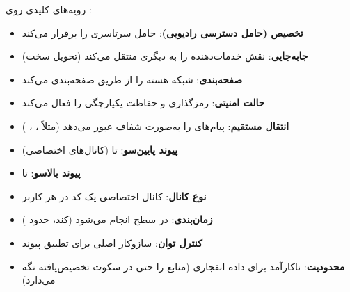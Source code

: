 
رویه‌های کلیدی روی :

\begin{itemize}
\tightlist
\item
  \textbf{تخصیص  (حامل دسترسی رادیویی)}: حامل سرتاسری را برقرار می‌کند
\item
  \textbf{جابه‌جایی}: نقش  خدمات‌دهنده را به  دیگری منتقل می‌کند (تحویل سخت)
\item
  \textbf{صفحه‌بندی}: شبکه هسته  را از طریق  صفحه‌بندی می‌کند
\item
  \textbf{حالت امنیتی}: رمزگذاری و حفاظت یکپارچگی را فعال می‌کند
\item
  \textbf{انتقال مستقیم}: پیام‌های  را به‌صورت شفاف عبور می‌دهد (مثلاً ، ، )
\end{itemize}



\CNchained{}

\begin{itemize}
\tightlist
\item
  \textbf{پیوند پایین‌سو}: تا  (کانال‌های اختصاصی)
\item
  \textbf{پیوند بالاسو}: تا 
\item
  \textbf{نوع کانال}: کانال اختصاصی   یک کد در هر کاربر
\item
  \textbf{زمان‌بندی}: در سطح  انجام می‌شود (کند،  حدود )
\item
  \textbf{کنترل توان}: سازوکار اصلی برای تطبیق پیوند
\item
  \textbf{محدودیت}: ناکارآمد برای داده انفجاری (منابع را حتی در سکوت تخصیص‌یافته نگه می‌دارد)
\end{itemize}



